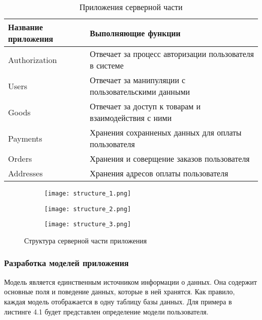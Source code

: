 \begin{longtable}{ | l | p{6cm} | }
    \caption{Приложения серверной части}
    \label{back:apps}
    \endfirsthead
    \endhead
    \hline
    Название приложения & Выполняющие функции \\ \hline
    Authorization & Отвечает за процесс авторизации пользователя в системе \\ \hline
    Users & Отвечает за манипуляции с пользовательскими данными \\ \hline
    Goods & Отвечает за доступ к товарам и взаимодействия с ними \\ \hline
    Payments & Хранения сохранненых данных для оплаты пользователя\\ \hline
    Orders & Хранения и соверщение заказов пользователя \\ \hline
    Addresses & Хранения адресов оплаты пользователя \\ \hline
\end{longtable}

\begin{figure}[h!]
    \begin{subfigure}[b]{0.3\textwidth}
    \centering
    \texttt{[image: structure\_1.png]}
    \caption{}
    \end{subfigure}
    \begin{subfigure}[b]{0.3\textwidth}
    \centering
    \texttt{[image: structure\_2.png]}
    \caption{}
    \end{subfigure}
    \begin{subfigure}[b]{0.3\textwidth}
    \centering
    \texttt{[image: structure\_3.png]}
    \caption{}
    \end{subfigure}
    \caption{ Структура серверной части приложения }
    \label{back:struct}
\end{figure}

\subsubsection{Разработка моделей приложения}\hfill

Модель является единственным источником информации о данных.
Она содержит основные поля и поведение данных, которые в ней хранятся.
Как правило, каждая модель отображается в одну таблицу базы данных.
Для примера в листинге 4.1 будет представлен определение модели пользователя.


